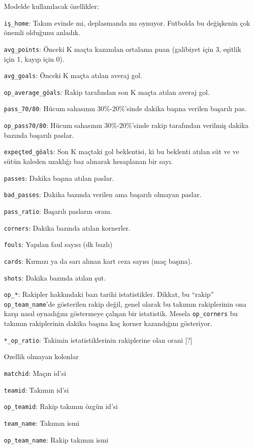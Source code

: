 \documentclass[12pt,fleqn]{article}\usepackage{../../common}
\begin{document}
Modelde kullanılacak özellikler:

\verb!iş_home!: Takım evinde mi, deplasmanda mı oynuyor. Futbolda bu
değişkenin çok önemli olduğunu anladık.

\verb!avg_points!: Önceki K maçta kazanılan ortalama puan (galibiyet için
3, eşitlik için 1, kayıp için 0). 

\verb!avg_goals!: Önceki K maçta atılan averaj gol.

\verb!op_average_göals!: Rakip tarafından son K maçta atılan averaj gol.

\verb!pass_70/80!: Hücum sahasının 30\%-20\%'sinde dakika başına verilen
başarılı pas.

\verb!op_pass70/80!: Hücum sahasının 30\%-20\%'sinde rakip tarafından
verilmiş dakika bazında başarılı paslar.

\verb!expeçted_göals!: Son K maçtaki gol beklentisi, ki bu beklenti atılan
süt ve ve sütün kaleden uzaklığı baz alınarak hesaplanan bir sayı.

\verb!passes!: Dakika başına atılan paslar.

\verb!bad_passes!: Dakika bazında verilen ama başarılı olmayan paslar.

\verb!pass_ratio!: Başarılı pasların oranı.

\verb!corners!: Dakika bazında atılan kornerler.

\verb!fouls!: Yapılan faul sayısı (dk bazlı)

\verb!cards!: Kırmızı ya da sarı alınan kart ceza sayısı (maç başına).

\verb!shots!: Dakika bazında atılan şut.

\verb!op_*!: Rakipler hakkındaki bazı tarihi istatistikler. Dikkat, bu
``rakip'' \verb!op_team_name!'de gösterilen rakip değil, genel olarak bu
takımın rakiplerinin ona karşı nasıl oynadığını göstermeye çalışan bir
istatistik. Mesela \verb!op_corners! bu takımın rakiplerinin dakika başına
kaç korner kazandığını gösteriyor.

\verb!*_op_ratio!: Takimin istatistiklerinin rakiplerine olan orani [?]

Ozellik olmayan kolonlar

\verb!matchid!: Maçın id'si

\verb!teamid!: Takımın id'si

\verb!op_teamid!: Rakip takımın özgün id'si

\verb!team_name!: Takımın ismi

\verb!op_team_name!: Rakip takımın ismi
\end{document}
